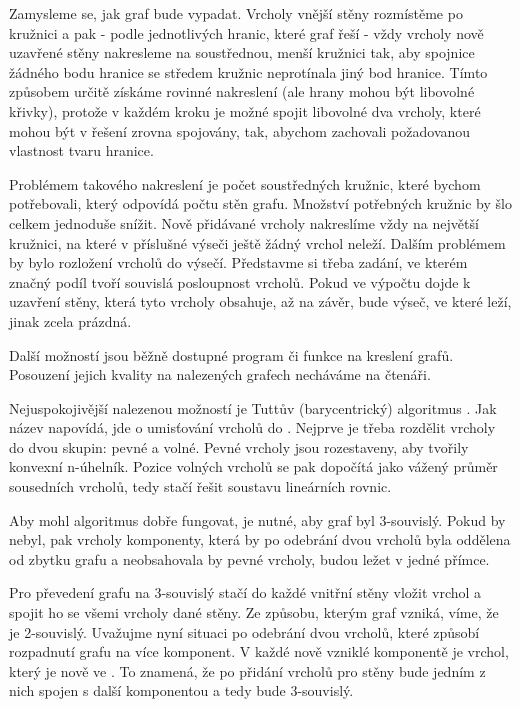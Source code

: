 Zamysleme se, jak graf bude vypadat. Vrcholy vnější stěny rozmístěme po kružnici a pak - podle jednotlivých hranic, které graf řeší - vždy vrcholy nově uzavřené stěny nakresleme na soustřednou, menší kružnici tak, aby spojnice žádného bodu hranice se středem kružnic neprotínala jiný bod hranice. Tímto způsobem určitě získáme rovinné nakreslení (ale hrany mohou být libovolné křivky), protože v každém kroku je možné spojit libovolné dva vrcholy, které mohou být v řešení zrovna spojovány, tak, abychom zachovali požadovanou vlastnost tvaru hranice.

Problémem takového nakreslení je počet soustředných kružnic, které bychom potřebovali, který odpovídá počtu stěn grafu. Množství potřebných kružnic by šlo celkem jednoduše snížit. Nově přidávané vrcholy nakreslíme vždy na největší kružnici, na které v příslušné výseči ještě žádný vrchol neleží. Dalším problémem by bylo rozložení vrcholů do výsečí. Představme si třeba zadání, ve kterém značný podíl tvoří souvislá posloupnost  vrcholů. Pokud ve výpočtu dojde k uzavření stěny, která tyto vrcholy obsahuje, až na závěr, bude výseč, ve které leží, jinak zcela prázdná.

Další možností jsou běžně dostupné program či funkce na kreslení grafů. Posouzení jejich kvality na nalezených grafech necháváme na čtenáři.

Nejuspokojivější nalezenou možností je Tuttův (barycentrický) algoritmus \cite{Tutte}. Jak název napovídá, jde o umisťování vrcholů do . Nejprve je třeba rozdělit vrcholy do dvou skupin: pevné a volné. Pevné vrcholy jsou rozestaveny, aby tvořily konvexní n-úhelník. Pozice volných vrcholů se pak dopočítá jako vážený průměr sousedních vrcholů, tedy stačí řešit soustavu lineárních rovnic.

Aby mohl algoritmus dobře fungovat, je nutné, aby graf byl 3-souvislý. Pokud by nebyl, pak vrcholy komponenty, která by po odebrání dvou vrcholů byla oddělena od zbytku grafu a neobsahovala by pevné vrcholy, budou ležet v jedné přímce.

Pro převedení grafu na 3-souvislý stačí do každé vnitřní stěny vložit vrchol a spojit ho se všemi vrcholy dané stěny. Ze způsobu, kterým graf vzniká, víme, že je 2-souvislý. Uvažujme nyní situaci po odebrání dvou vrcholů, které způsobí rozpadnutí grafu na více komponent. V každé nově vzniklé komponentě je vrchol, který je nově ve . To znamená, že po přidání vrcholů pro stěny bude jedním z nich spojen s další komponentou a tedy bude 3-souvislý. 

